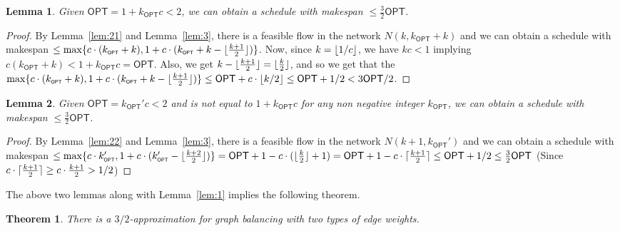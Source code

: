 \documentclass[11pt]{article}
\newcommand{\OPT}{\mathsf{OPT}}
\newcommand{\kk}{k_{\scriptscriptstyle \OPT}}
\newcommand{\kkkk}{k_{\scriptscriptstyle \OPT}'}
\DeclarePairedDelimiter\floor{\lfloor}{\rfloor}
\DeclarePairedDelimiter\ceil{\lceil}{\rceil}
\newtheorem{theorem}{Theorem}
\newtheorem{lemma}{Lemma}
\begin{document}
\begin{lemma}\label{lem:41}
	Given $\OPT = 1+\kk c < 2$, we can obtain a schedule with makespan $\leq \frac{3}{2} \OPT$.
\end{lemma}
\begin{proof}
By Lemma~\ref{lem:21} and Lemma~\ref{lem:3}, there is a feasible flow in the network $N(k,\kk+k)$ and we can obtain a schedule with makespan $\leq \max \{c \cdot (\kk+k), 1 + c \cdot(\kk+k-\floor{\frac{k+1}{2}})\}$.
Now, since $k = \floor{1/c}$, we have $kc < 1$ implying $c(\kk + k) < 1 + \kk c = \OPT$.
Also, we get $k - \floor{\frac{k+1}{2}} =  \floor{\frac{k}{2}}$, and so we get that the $\max \{c \cdot (\kk+k), 1 + c \cdot(\kk+k-\floor{\frac{k+1}{2}})\} \leq \OPT + c\cdot\floor{k/2} \leq \OPT  + 1/2 < 3\OPT/2$.
\end{proof}

\begin{lemma}\label{lem:42}
	Given $\OPT = \kkkk c < 2$ and is not equal to $1+\kk c$ for any non negative integer $\kk$, we can obtain a schedule with makespan $\leq \frac{3}{2} \OPT$.
\end{lemma}
\begin{proof}
By Lemma~\ref{lem:22} and Lemma~\ref{lem:3}, there is a feasible flow in the network $N(k+1,\kkkk)$ and we can obtain a schedule with makespan $\leq \max \{c \cdot \kkkk, 1 + c \cdot(\kkkk-\floor{\frac{k+2}{2}})\} = \OPT + 1 - c \cdot (\floor{\frac{k}{2}}+1) =\OPT + 1 - c \cdot \ceil{\frac{k+1}{2}}  \leq \OPT + 1/2 \leq \frac{3}{2}\OPT$ (Since $c \cdot \ceil{\frac{k+1}{2}} \geq c \cdot \frac{k+1}{2} > 1/2$)
\end{proof}
The above two lemmas along with Lemma~\ref{lem:1} implies the following theorem.
\begin{theorem}\label{thm:main}
	There is a $3/2$-approximation for graph balancing with two types of edge weights.
\end{theorem}
\iffalse
\begin{proof}
	One first checks if $N(k,k+ \ceil{\frac{1}{c}}-1)$ or $N(k+1, \ceil{\frac{2}{c}}-1)$ has a feasible flow; if not, by Lemma~\ref{lem:21} and~\ref{lem:22} we are guaranteed $\OPT \geq 2$, and by Lemma~\ref{lem:1} we have a $3/2$-approximation algorithm.
	By binary search, we find the smallest integer $k_s$ for which $N(k+1,k_{s})$ has a feasible flow. Set $k_r=k_s-1$ if $N(k,k_s-1)$ is feasible, else $k_r=k_s$. Note that $N(k,k_s-2)$ is not feasible, otherwise $N(k+1,k_s-1)$ would be feasible by sending an extra $1$ flow of each big job along a path to a machine where this job is assigned by Lemma~\ref{lem:3} contradicting the minimality of $k_s$. Get orientations as described by Lemma~\ref{lem:3} with respect to both $N(k+1,k_{s})$ and $N(k,k_{r})$, and output the orientation with  minimum makespan.
	If $\OPT= 1+\kk \cdot c$ -- by Lemma~\ref{lem:21} $k_r \leq k+\kk$. So by Lemma~\ref{lem:41}, we get an orientation with all weighted in-degrees at most $\frac{3}{2} \OPT$.  
	Otherwise $\OPT= \kkkk \cdot c$ -- by Lemma~\ref{lem:22} $k_s \leq \kkkk$. So by Lemma~\ref{lem:42}, we get an orientation with all weighted in-degrees at most $\frac{3}{2} \OPT$.
\end{proof}
\fi
\end{document}

